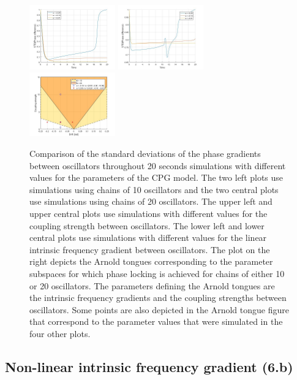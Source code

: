 \documentclass[a4paper]{scrartcl}
\begin{document}
\begin{figure}[!t]
	\includegraphics[width=0.33\textwidth]{results/6.a/N10_A_const.jpg}
	\includegraphics[width=0.33\textwidth]{results/6.a/N20_A_const.jpg}
	\includegraphics[width=0.33\textwidth]{results/6.a/ArnoldTongue.jpg}
	\caption{Comparison of the standard deviations of the phase gradients between oscillators throughout 20 seconds simulations with different values for the parameters of the CPG model. The two left plots use simulations using chains of 10 oscillators and the two central plots use simulations using chains of 20 oscillators. The upper left and upper central plots use simulations with different values for the coupling strength between oscillators. The lower left and lower central plots use simulations with different values for the linear intrinsic frequency gradient between oscillators. The plot on the right depicts the Arnold tongues corresponding to the parameter subspaces for which phase locking is achieved for chains of either 10 or 20 oscillators. The parameters defining the Arnold tongues are the intrinsic frequency gradients and the coupling strengths between oscillators. Some points are also depicted in the Arnold tongue figure that correspond to the parameter values that were simulated in the four other plots.}
	\label{fig:f6a-phaseSTD}
\end{figure}


\subsection{Non-linear intrinsic frequency gradient (6.b)}
\end{document}
